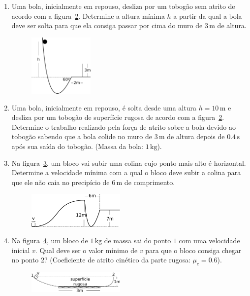 \documentclass[twocolumn=on,DIV=calc]{scrartcl}
\newcommand{\un}[1]{\mathrm{#1}}
\begin{document}
\begin{enumerate}
\begin{figure}[ht]
    \caption{}
    \label{fig:3}
  \end{figure}
\item Uma bola, inicialmente em repouso, desliza por um tobogão sem
  atrito de acordo com a figura~\ref{fig:4}. Determine a altura mínima
  $h$ a partir da qual a bola deve ser solta para que ela consiga
  passar por cima do muro de $3\,\un m$ de altura.
  \begin{figure}[ht]
    \centering
    \includegraphics[width=0.3\textwidth,keepaspectratio]{lista5-questao4.pdf}
    \caption{}
    \label{fig:4}
  \end{figure}
\item Uma bola, inicialmente em repouso, é solta desde uma altura
  $h=10\,\un{m}$ e desliza por um tobogão de superfície rugosa de
  acordo com a figura~\ref{fig:4}. Determine o trabalho realizado pela
  força de atrito sobre a bola devido ao tobogão sabendo que a bola
  colide no muro de $3\,\un{m}$ de altura depois de $0.4\,\un{s}$ após
  sua saída do tobogão. (Massa da bola: $1\,\un{kg}$).
\item Na figura~\ref{fig:5}, um bloco vai subir uma colina cujo ponto
  mais alto é horizontal. Determine a velocidade mínima com a qual o
  bloco deve subir a colina para que ele não caia no precipício de
  $6\,\un{m}$ de comprimento.
  \begin{figure}[ht]
    \centering
    \includegraphics[width=0.45\textwidth,keepaspectratio]{lista5-questao5.pdf}
    \caption{}
    \label{fig:5}
  \end{figure}
\item Na figura~\ref{fig:6}, um bloco de $1\,\un{kg}$ de massa sai do
  ponto $1$ com uma velocidade inicial $v$. Qual deve ser o valor
  mínimo de $v$ para que o bloco consiga chegar no ponto $2$?
  (Coeficiente de atrito cinético da parte rugosa: $\mu_c=0.6$).
  \begin{figure}[ht]
    \centering
    \includegraphics[width=0.45\textwidth,keepaspectratio]{lista5-questao6.pdf}
    \caption{}
    \label{fig:6}
  \end{figure}  
  \end{enumerate}
\end{document}
